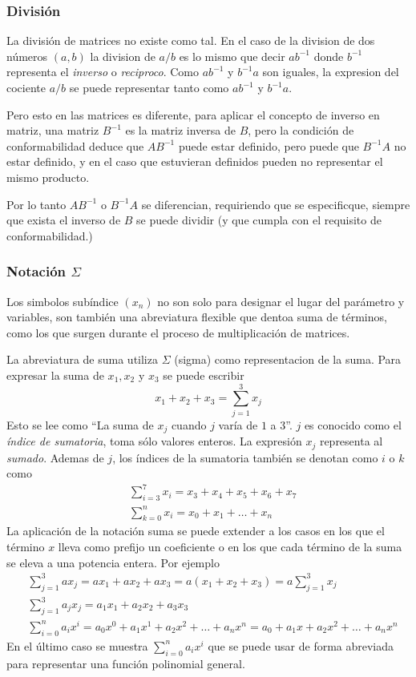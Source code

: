 \subsubsection{División}

La división de matrices no existe como tal. En el caso de la division de dos números \((a, b)\) la division de \(a/b\) es lo mismo que decir \(ab^{-1}\) donde \(b^{-1}\) representa el \textit{inverso} o \textit{reciproco}. Como \(ab^{-1}\) y \(b^{-1}a\) son iguales, la expresion del cociente \(a/b\) se puede representar tanto como \(ab^{-1}\) y \(b^{-1}a\).

Pero esto en las matrices es diferente, para aplicar el concepto de inverso en matriz, una matriz \(B^{-1}\) es la matriz inversa de \(B\), pero la condición de conformabilidad deduce que \(AB^{-1}\) puede estar definido, pero puede que \(B^{-1}A\) no estar definido, y en el caso que estuvieran definidos pueden no representar el mismo producto.

Por lo tanto \(AB^{-1}\) o \(B^{-1}A\) se diferencian, requiriendo que se especificque, siempre que exista el inverso de \(B\) se puede dividir (y que cumpla con el requisito de conformabilidad.)


\subsubsection{Notación \(\Sigma\)}

Los simbolos subíndice \((x_n)\) no son solo para designar el lugar del parámetro y variables, son también una abreviatura flexible que dentoa suma de términos, como los que surgen durante el proceso de multiplicación de matrices.

La abreviatura de suma utiliza \(\Sigma\) (sigma) como representacion de la suma. Para expresar la suma de \(x_1, x_2\) y \(x_3\) se puede escribir 
\[
x_1 + x_2 + x_3 = \sum_{j=1}^{3} x_j
\]
Esto se lee como ``La suma de \(x_j\) cuando \(j\) varía de \(1\) a \(3\)''. \(j\) es conocido como el \textit{índice de sumatoria}, toma sólo valores enteros. La expresión \(x_j\) representa al \textit{sumado}. Ademas de \(j\), los índices de la sumatoria también se denotan como \(i\) o \(k\) como 
$$
\begin{aligned}
    & \sum_{i=3}^{7} x_i =x_3 + x_4 + x_5 + x_6 +x_7 \\
    & \sum_{k=0}^{n} x_i =x_0 + x_1 + \dots + x_n 
\end{aligned}
$$
La aplicación de la notación suma se puede extender a los casos en los que el término \(x\) lleva como prefijo un coeficiente o en los que cada término de la suma se eleva a una potencia entera. Por ejemplo 
$$
\begin{aligned}
    & \sum_{j=1}^{3} ax_j = ax_1 + ax_2 + ax_3 = a(x_1 + x_2 + x_3) = a \sum_{j=1}^{3} x_j \\
    & \sum_{j=1}^{3} a_jx_j = a_1x_1 + a_2x_2 + a_3x_3 \\
    & \sum_{i=0}^{n} a_ix^i = a_0x^0 + a_1x^1 + a_2x^2 + \dots + a_nx^n = a_0 + a_1x + a_2x^2 + \dots + a_nx^n 
\end{aligned}
$$
En el último caso se muestra \(\sum_{i=0}^{n} a_ix^i\) que se puede usar de forma abreviada para representar una función polinomial general.

